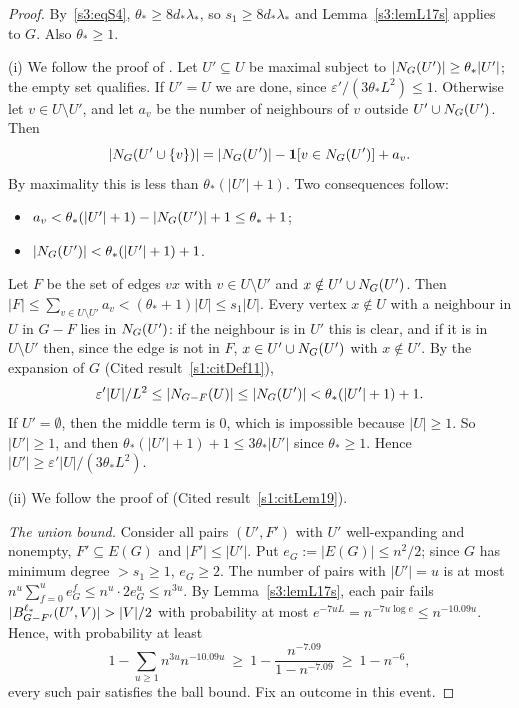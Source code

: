 \begin{proof}
By~\ref{s3:eqS4}, $\theta_*\ge 8d_*\lambda_*$, so $s_1\ge 8d_*\lambda_*$
and Lemma~\ref{s3:lemL17s} applies to $G$. Also $\theta_*\ge1$.

(i) We follow the proof of \cite[Proposition~18]{BM}. Let $U'\subseteq U$
be maximal subject to $|N_G(U')|\ge\theta_*|U'|$; the empty set
qualifies. If $U'=U$ we are done, since
$\varepsilon'/(3\theta_*L^2)\le1$. Otherwise let $v\in U\setminus U'$, and
let $a_v$ be the number of neighbours of $v$ outside
$U'\cup N_G(U')$. Then
\[
|N_G(U'\cup\{v\})|=|N_G(U')|-\mathbf{1}[v\in N_G(U')]+a_v .
\]
By maximality this is less than $\theta_*(|U'|+1)$. Two consequences
follow:
\begin{itemize}
\item $a_v<\theta_*(|U'|+1)-|N_G(U')|+1\le\theta_*+1$;
\item $|N_G(U')|<\theta_*(|U'|+1)+1$.
\end{itemize}
Let $F$ be the set of edges $vx$ with $v\in U\setminus U'$ and
$x\notin U'\cup N_G(U')$. Then
$|F|\le\sum_{v\in U\setminus U'}a_v<(\theta_*+1)|U|\le s_1|U|$.
Every vertex $x\notin U$ with a neighbour in $U$ in $G-F$ lies in
$N_G(U')$: if the neighbour is in $U'$ this is clear, and if it is in
$U\setminus U'$ then, since the edge is not in $F$,
$x\in U'\cup N_G(U')$ with $x\notin U'$. By the expansion of $G$
(Cited result~\ref{s1:citDef11}),
\[
\varepsilon'|U|/L^2\le|N_{G-F}(U)|\le|N_G(U')|<\theta_*(|U'|+1)+1 .
\]
If $U'=\emptyset$, then the middle term is $0$, which is impossible
because $|U|\ge1$. So $|U'|\ge1$, and then
$\theta_*(|U'|+1)+1\le3\theta_*|U'|$ since $\theta_*\ge1$. Hence
$|U'|\ge\varepsilon'|U|/(3\theta_*L^2)$.

(ii) We follow the proof of \cite[Lemma~19]{BM}
(Cited result~\ref{s1:citLem19}).

\emph{The union bound.} Consider all pairs $(U',F')$ with $U'$
well-expanding and nonempty, $F'\subseteq E(G)$ and $|F'|\le|U'|$. Put
$e_G:=|E(G)|\le n^2/2$; since $G$ has minimum degree $>s_1\ge1$,
$e_G\ge2$. The number of pairs with $|U'|=u$ is at most
$n^u\sum_{f=0}^{u}e_G^f\le n^u\cdot2e_G^u\le n^{3u}$. By
Lemma~\ref{s3:lemL17s}, each pair fails
$|\Ball{\ell_*}{G-F'}{U',V}|>|V|/2$ with probability at most
$e^{-7uL}=n^{-7u\log e}\le n^{-10.09u}$. Hence, with probability at least
\[
1-\sum_{u\ge1}n^{3u}n^{-10.09u}\ \ge\ 1-\frac{n^{-7.09}}{1-n^{-7.09}}\ \ge\ 1-n^{-6},
\]
every such pair satisfies the ball bound. Fix an outcome in this event.


\end{proof}
